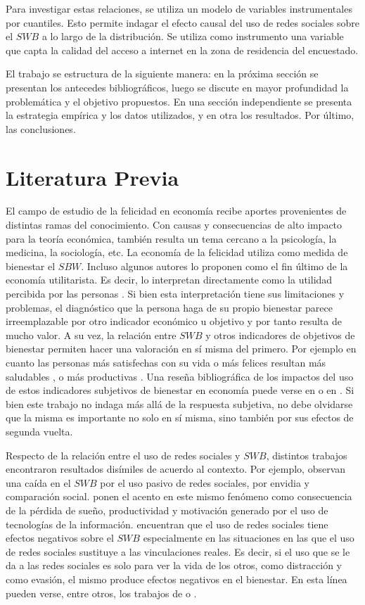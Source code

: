 \documentclass[11pt]{article}
\begin{document}
Para investigar estas relaciones, se utiliza un modelo de variables instrumentales por cuantiles. Esto permite indagar el efecto causal del uso de redes sociales sobre el $SWB$ a lo largo de la distribución. Se utiliza como instrumento una variable que capta la calidad del acceso a internet en la zona de residencia del encuestado. 

El trabajo se estructura de la siguiente manera: en la próxima sección se presentan los antecedes bibliográficos, luego se discute en mayor profundidad la problemática y el objetivo propuestos. En una sección independiente se presenta la estrategia empírica y los datos utilizados, y en otra los resultados. Por último, las conclusiones. 

\section{Literatura Previa}

El campo de estudio de la felicidad en economía recibe aportes provenientes de distintas ramas del conocimiento. Con causas y consecuencias de alto impacto para la teoría económica, también resulta un tema cercano a la psicología, la medicina, la sociología, etc. La economía de la felicidad utiliza como medida de bienestar el $SBW$. Incluso algunos autores lo proponen como el fin último de la economía utilitarista. Es decir, lo interpretan directamente como la utilidad percibida por las personas \cite{Easterlin2021}. Si bien esta interpretación tiene sus limitaciones y problemas, el diagnóstico que la persona haga de su propio bienestar parece irreemplazable por otro indicador económico u objetivo y por tanto resulta de mucho valor. A su vez, la relación entre $SWB$ y otros indicadores de objetivos de bienestar permiten hacer una valoración en sí misma del primero. Por ejemplo en cuanto las personas más satisfechas con su vida o más felices resultan más saludables \cite{STEPTOE2015640, Diener2011}, o más productivas \cite{Oswald2009}. Una reseña bibliográfica de los impactos del uso de estos indicadores subjetivos de bienestar en economía puede verse en  o en . Si bien este trabajo no indaga más allá de la respuesta subjetiva, no debe olvidarse que la misma es importante no solo en sí misma, sino también por sus efectos de segunda vuelta. 

Respecto de la relación entre el uso de redes sociales y $SWB$, distintos trabajos encontraron resultados disímiles de acuerdo al contexto. Por ejemplo,  observan una caída en el $SWB$ por el uso pasivo de redes sociales, por envidia y comparación social.  ponen el acento en este mismo fenómeno como consecuencia de la pérdida de sueño, productividad y motivación generado por el uso de tecnologías de la información.  encuentran que el uso de redes sociales tiene efectos negativos sobre el $SWB$ especialmente en las situaciones en las que el uso de redes sociales sustituye a las vinculaciones reales. Es decir, si el uso que se le da a las redes sociales es solo para ver la vida de los otros, como distracción y como evasión, el mismo produce efectos negativos en el bienestar. En esta línea pueden verse, entre otros, los trabajos de  o . 
\end{document}
